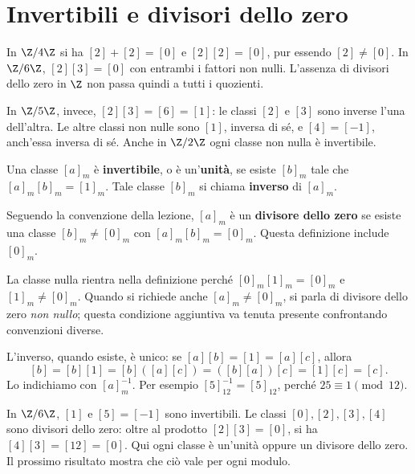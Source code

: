 \section{Invertibili e divisori dello zero}
\begin{esempio}
In $\Z/4\Z$ si ha $[2]+[2]=[0]$ e $[2][2]=[0]$, pur essendo $[2]\ne[0]$. In $\Z/6\Z$, $[2][3]=[0]$ con entrambi i fattori non nulli. L'assenza di divisori dello zero in $\Z$ non passa quindi a tutti i quozienti.

In $\Z/5\Z$, invece, $[2][3]=[6]=[1]$: le classi $[2]$ e $[3]$ sono inverse l'una dell'altra. Le altre classi non nulle sono $[1]$, inversa di sé, e $[4]=[-1]$, anch'essa inversa di sé. Anche in $\Z/2\Z$ ogni classe non nulla è invertibile.
\end{esempio}

\begin{definizione}
Una classe $[a]_m$ è \textbf{invertibile}, o è un'\textbf{unità}, se esiste $[b]_m$ tale che $[a]_m[b]_m=[1]_m$. Tale classe $[b]_m$ si chiama \textbf{inverso} di $[a]_m$.

Seguendo la convenzione della lezione, $[a]_m$ è un \textbf{divisore dello zero} se esiste una classe $[b]_m\ne[0]_m$ con $[a]_m[b]_m=[0]_m$. Questa definizione include $[0]_m$.
\end{definizione}

\begin{osservazione}
La classe nulla rientra nella definizione perché $[0]_m[1]_m=[0]_m$ e $[1]_m\ne[0]_m$. Quando si richiede anche $[a]_m\ne[0]_m$, si parla di divisore dello zero \emph{non nullo}; questa condizione aggiuntiva va tenuta presente confrontando convenzioni diverse.
\end{osservazione}

L'inverso, quando esiste, è unico: se $[a][b]=[1]=[a][c]$, allora
\[
[b]=[b][1]=[b]([a][c])=([b][a])[c]=[1][c]=[c].
\]
Lo indichiamo con $[a]_m^{-1}$. Per esempio $[5]_{12}^{-1}=[5]_{12}$, perché $25\equiv1\pmod{12}$.

\begin{esempio}
In $\Z/6\Z$, $[1]$ e $[5]=[-1]$ sono invertibili. Le classi $[0],[2],[3],[4]$ sono divisori dello zero: oltre al prodotto $[2][3]=[0]$, si ha $[4][3]=[12]=[0]$. Qui ogni classe è un'unità oppure un divisore dello zero. Il prossimo risultato mostra che ciò vale per ogni modulo.
\end{esempio}

